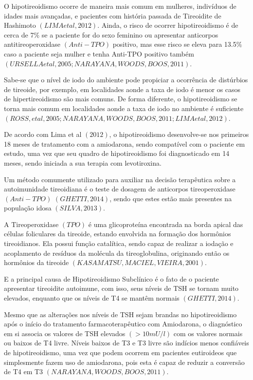 \documentclass[svgnames,12pt,oneside, openright,a4paper]{scrbook}
\begin{document}
O hipotireoidismo ocorre de maneira mais comum em mulheres, indivíduos de idades mais avançadas, e pacientes com história passada de Tireoidite de Hashimoto $(LIMA et al, 2012)$. Ainda, o risco de ocorrer hipotireoidismo é de cerca de 7$\%$ se a paciente for do sexo feminino ou apresentar anticorpos antitireoperoxidase $(Anti-TPO)$ positivo, mas esse risco se eleva para 13.5$\%$ caso a paciente seja mulher e tenha Anti-TPO positivo também $(URSELLA et al, 2005; NARAYANA, WOODS, BOOS, 2011)$.   

Sabe-se que o nível de iodo do ambiente pode propiciar a ocorrência de distúrbios de tireoide, por exemplo, em localidades aonde a taxa de iodo é menor os casos de hipertireoidismo são mais comuns. De forma diferente, o hipotireoidismo se torna mais comum em localidades aonde a taxa de iodo no ambiente é suficiente $(ROSS, et al, 2005 ;NARAYANA, WOODS, BOOS, 2011; LIMA et al, 2012)$. 

De acordo com Lima et al $(2012)$, o hipotireoidismo desenvolve-se nos primeiros 18 meses de tratamento com a amiodarona, sendo compatível com o paciente em estudo, uma vez que seu quadro de hipotireoidismo foi diagnosticado em 14 meses, sendo iniciada a sua terapia com levotiroxina. 

Um método comumente utilizado para auxiliar na decisão terapêutica sobre a autoimunidade tireoidiana é o teste de dosagem de anticorpos tireoperoxidase $(Anti-TPO)$ $(GHETTI, 2014)$, sendo que estes estão mais presentes na população idosa $(SILVA, 2013)$. 

A Tireoperoxidase $(TPO)$ é uma glicoproteína encontrada na borda apical das células foliculares da tireoide, estando envolvida na formação dos hormônios tireoidianos. Ela possui função catalítica, sendo capaz de realizar a iodação e acoplamento de resíduos da molécula da tireoglobulina, originando então os hormônios da tireoide $(KASAMATSU, MACIEL, VIEIRA, 2001)$. 

E a principal causa de Hipotireoidismo Subclínico é o fato de o paciente apresentar tireoidite autoimune, com isso, seus níveis de TSH se tornam muito elevados, enquanto que os níveis de T4 se mantêm normais $(GHETTI, 2014)$. 

Mesmo que as alterações nos níveis de TSH sejam brandas no hipotireoidismo após o início do tratamento farmacoterapêutico com Amiodarona, o diagnóstico em si associa os valores de TSH elevados $(>10mU/l)$ com os valores normais ou baixos de T4 livre. Níveis baixos de T3 e T3 livre são indícios menos confiáveis de hipotireoidismo, uma vez que podem ocorrem em pacientes eutiroideos que simplesmente fazem uso de amiodarona, pois esta é capaz de reduzir a conversão de T4 em T3 $(NARAYANA, WOODS, BOOS, 2011)$. 
\end{document}
